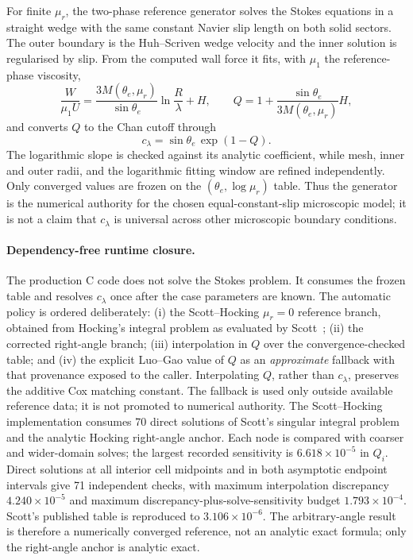\documentclass[11pt,a4paper]{article}
\newcommand{\mur}{\mu_r}
\begin{document}
For finite $\mur$, the two-phase reference generator solves the Stokes
equations in a straight wedge with the same constant Navier slip length on
both solid sectors. The outer boundary is the Huh--Scriven wedge velocity and
the inner solution is regularised by slip. From the computed wall force it
fits, with $\mu_1$ the reference-phase viscosity,
\begin{equation}
  \frac{W}{\mu_1 U}
  = \frac{3M(\theta_e,\mur)}{\sin\theta_e}
      \ln\!\frac{R}{\lambda} + H,
  \qquad
  Q=1+\frac{\sin\theta_e}{3M(\theta_e,\mur)}H,
  \label{eq:Q-extraction}
\end{equation}
and converts $Q$ to the Chan cutoff through
\begin{equation}
  c_{\lambda}=\sin\theta_e\,\exp(1-Q).
  \label{eq:Q-to-c}
\end{equation}
The logarithmic slope is checked against its analytic coefficient, while mesh,
inner and outer radii, and the logarithmic fitting window are refined
independently. Only converged values are frozen on the
$(\theta_e,\log\mur)$ table. Thus the generator is the numerical authority for
the chosen equal-constant-slip microscopic model; it is not a claim that
$c_{\lambda}$ is universal across other microscopic boundary conditions.

\paragraph{Dependency-free runtime closure.}
The production C code does not solve the Stokes problem. It consumes the
frozen table and resolves $c_{\lambda}$ once after the case parameters are
known. The automatic policy is ordered deliberately: (i) the Scott--Hocking
$\mur=0$ reference branch, obtained from Hocking's integral problem as
evaluated by Scott~\cite{hocking1977,scott2020}; (ii) the corrected
right-angle branch; (iii) interpolation in $Q$ over the convergence-checked
table; and
(iv) the explicit Luo--Gao value of $Q$ as an \emph{approximate} fallback
with that provenance exposed to the caller. Interpolating $Q$, rather than
$c_{\lambda}$, preserves the additive Cox matching constant. The fallback is
used only outside available reference data; it is not promoted to numerical
authority.
The Scott--Hocking implementation consumes 70 direct solutions of Scott's
singular integral problem and the analytic Hocking right-angle anchor. Each
node is compared with coarser and wider-domain solves; the largest recorded
sensitivity is $6.618\times10^{-5}$ in $Q_i$. Direct solutions at all interior
cell midpoints and in both asymptotic endpoint intervals give 71 independent
checks, with maximum interpolation discrepancy $4.240\times10^{-5}$ and
maximum discrepancy-plus-solve-sensitivity budget $1.793\times10^{-4}$.
Scott's published table is reproduced to $3.106\times10^{-6}$. The
arbitrary-angle result is therefore a numerically converged reference, not an
analytic exact formula; only the right-angle anchor is analytic exact.
\end{document}
